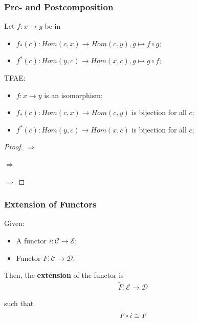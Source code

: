 \documentclass[Total.tex]{subfiles}
\begin{document}
					\subsubsection{Pre- and Postcomposition}
					
					\begin{Def} Let $f:x\rightarrow y$ be in 
						\begin{itemize}
							\item $f_*(c):Hom(c,x)\rightarrow Hom(c,y),g\mapsto f\circ g$;
							\item $f^*(c):Hom(y,c)\rightarrow Hom(x,c),g\mapsto g\circ f$;
						\end{itemize}
					\end{Def}
					
					\begin{proposition}
						TFAE:
						\begin{itemize}
							\item $f:x\rightarrow y$ is an isomorphism;
							\item $f_*(c):Hom(c,x)\rightarrow Hom(c,y)$ is bijection for all $c$;
							\item $f^*(c):Hom(y,c)\rightarrow Hom(x,c)$ is bijection for all $c$;
						\end{itemize}
					\end{proposition}
					\begin{proof}
						$\Rightarrow$
						
						
						$\Rightarrow$
						
						$\Rightarrow$
					\end{proof}
					
					\subsubsection{Extension of Functors}
						\begin{Def}
							Given:
							\begin{itemize}
								\item A functor $i:\mathcal{C}\rightarrow \mathcal{E}$;
								\item Functor $F:\mathcal{C}\rightarrow \mathcal{D}$;
							\end{itemize}
							
							Then, the \textbf{extension} of the functor is 
							\begin{gather*}
								\tilde{F}:\mathcal{E}\rightarrow \mathcal{D}
							\end{gather*}
							
							such that
							\begin{gather*}
								\tilde{F}\circ i\cong F
							\end{gather*}
						\end{Def}
\end{document}
